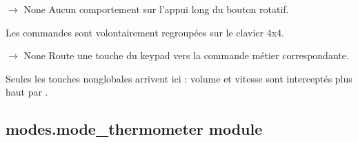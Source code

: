 \documentclass[letterpaper,10pt,french]{sphinxmanual}
\begin{document}
\begin{fulllineitems}
\begin{fulllineitems}
\end{fulllineitems}


\begin{fulllineitems}
\label{\detokenize{api/modes:modes.mode_reading_machine.ModeReadingMachine.on_long_press}}
\pysigstartsignatures
\pysiglinewithargsret
{}
{}
{{ $\rightarrow$ None}}
\pysigstopsignatures
\sphinxAtStartPar
Aucun comportement sur l’appui long du bouton rotatif.

\sphinxAtStartPar
Les commandes sont volontairement regroupées sur le clavier 4x4.

\end{fulllineitems}


\begin{fulllineitems}
\label{\detokenize{api/modes:modes.mode_reading_machine.ModeReadingMachine.on_keypad_key}}
\pysigstartsignatures
\pysiglinewithargsret
{}
{}
{{ $\rightarrow$ None}}
\pysigstopsignatures
\sphinxAtStartPar
Route une touche du keypad vers la commande métier correspondante.

\sphinxAtStartPar
Seules les touches non\sphinxhyphen{}globales arrivent ici : volume et vitesse
sont interceptés plus haut par .

\end{fulllineitems}


\end{fulllineitems}



\subsection{modes.mode\_thermometer module}
\label{\detokenize{api/modes:module-modes.mode_thermometer}}\label{\detokenize{api/modes:modes-mode-thermometer-module}}
\end{document}
